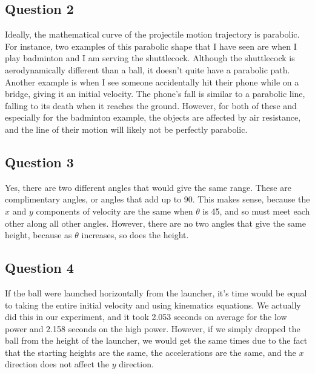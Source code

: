 \documentclass [12pt, letterpaper, twoside] {article}
\begin{document}
\subsection*{Question 2}
Ideally, the mathematical curve of the projectile motion trajectory is parabolic. For instance, two examples of this parabolic shape that I have seen are when I play badminton and I am serving the shuttlecock. Although the shuttlecock is aerodynamically different than a ball, it doesn't quite have a parabolic path. \\
Another example is when I see someone accidentally hit their phone while on a bridge, giving it an initial velocity. The phone's fall is similar to a parabolic line, falling to its death when it reaches the ground. However, for both of these and especially for the badminton example, the objects are affected by air resistance, and the line of their motion will likely not be perfectly parabolic. \\

\subsection* {Question 3}
Yes, there are two different angles that would give the same range. These are complimentary angles, or angles that add up to 90\degree. This makes sense, because the \(x\) and \(y\) components of velocity are the same when \(\theta\) is 45\degree, and so must meet each other along all other angles. However, there are no two angles that give the same height, because as \(\theta\) increases, so does the height.

\subsection* {Question 4}
If the ball were launched horizontally from the launcher, it's time would be equal to taking the entire initial velocity and using kinematics equations. We actually did this in our experiment, and it took 2.053 seconds on average for the low power and 2.158 seconds on the high power. However, if we simply dropped the ball from the height of the launcher, we would get the same times due to the fact that the starting heights are the same, the accelerations are the same, and the \(x\) direction does not affect the \(y\) direction.
\end{document}
